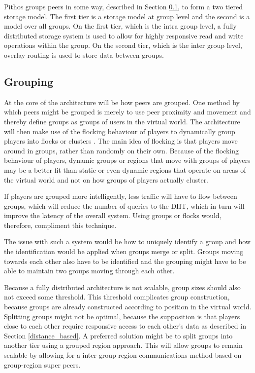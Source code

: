 \documentclass[10pt,a4paper,conference]{IEEEtran}
\begin{document}
Pithos groups peers in some way, described in Section \ref{grouping}, to form a two tiered storage model. The first tier is a storage model at group
level and the second is a model over all groups. On the first tier, which is the intra group level, a fully distributed storage system is used to
allow for highly responsive read and write operations within the group. On the second tier, which is the inter group level, overlay routing is used
to store data between groups.

\subsection{Grouping}
\label{grouping}

At the core of the architecture will be how peers are grouped. One method by which peers might be grouped is merely to use peer proximity and
movement and thereby define groups as groups of users in the virtual world. The architecture will then make use of the flocking behaviour of players
to dynamically group players into flocks or clusters \cite{flocking}. The main idea of flocking is that players move around in groups, rather than
randomly on their own. Because of the flocking behaviour of players, dynamic groups or regions that move with groups of players may be a better fit
than static or even dynamic regions that operate on areas of the virtual world and not on how groups of players actually cluster.

If players are grouped more intelligently, less traffic will have to flow between groups, which will reduce the number of queries to the DHT, which
in turn will improve the latency of the overall system. Using groups or flocks would, therefore, compliment this technique.

The issue with such a system would be how to uniquely identify a group and how the identification would be applied when groups merge or split. Groups
moving towards each other also have to be identified and the grouping might have to be able to maintain two groups moving through each other.

Because a fully distributed architecture is not scalable, group sizes should also not exceed some threshold. This threshold complicates group
construction, because groups are already constructed according to position in the virtual world. Splitting groups might not be optimal, because the
supposition is that players close to each other require responsive access to each other's data as described in Section \ref{distance_based}. A
preferred solution might be to split groups into another tier using a grouped region approach. This will allow groups to remain scalable by allowing
for a inter group region communications method based on group-region super peers.
\end{document}
